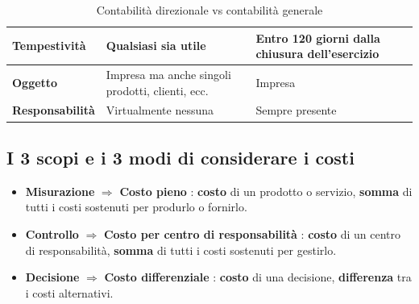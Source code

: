 \documentclass[a4paper,10pt]{article}
\begin{document}
\begin{table}[H]
{\begin{tabular}{|l|l|l|}
            \hline
            \textbf{Tempestività         } & Qualsiasi sia utile                                    & Entro 120 giorni dalla chiusura dell'esercizio            \\
            \hline
            \textbf{Oggetto              } & Impresa ma anche singoli prodotti, clienti, ecc.       & Impresa                                                   \\
            \hline
            \textbf{Responsabilità       } & Virtualmente nessuna                                   & Sempre presente                                           \\
            \hline
        \end{tabular}
    }
    \caption{Contabilità direzionale vs contabilità generale}
\end{table}
\subsection{I 3 scopi e i 3 modi di considerare i costi}
\begin{itemize}
    \item \textbf{Misurazione} $\Rightarrow$ \textbf{Costo pieno} : \textbf{costo} di un prodotto o servizio, \textbf{somma} di tutti i costi sostenuti per produrlo o fornirlo.
    \item \textbf{Controllo} $\Rightarrow$ \textbf{Costo per centro di responsabilità} : \textbf{costo} di un centro di responsabilità, \textbf{somma} di tutti i costi sostenuti per gestirlo.
    \item \textbf{Decisione} $\Rightarrow$ \textbf{Costo differenziale} : \textbf{costo} di una decisione, \textbf{differenza} tra i costi alternativi.
\end{itemize}
\end{document}
